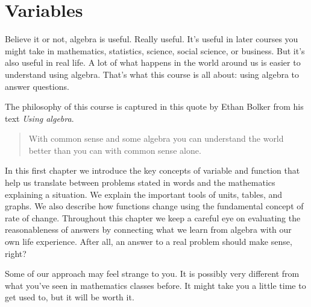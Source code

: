 \chapter{Variables}

Believe it or not, algebra is useful.  Really useful. It's useful in later courses you might take in mathematics, statistics, science, social science, or business.  But it's also useful in real life.  A lot of what happens in the world around us is easier to understand using algebra.  That's what this course is all about:  using algebra to answer questions. 

The philosophy of this course is captured in this quote by Ethan Bolker from his text \emph{Using algebra}.
\begin{quote} With common sense and some algebra you can understand the world better than you can with common sense alone.
\end{quote}

In this first chapter we introduce the key concepts of variable and function that help us translate between problems stated in words and the mathematics explaining a situation.  We explain the important tools of units, tables, and graphs.  We also describe how functions change using the fundamental concept of rate of change.  Throughout this chapter we keep a careful eye on evaluating the reasonableness of answers by connecting what we learn from algebra with our own life experience. After all, an answer to a real problem should make sense, right?

Some of our approach may feel strange to you.  It is possibly very different from what you've seen in mathematics classes before.   It might take you a little time to get used to, but it will be worth it.


